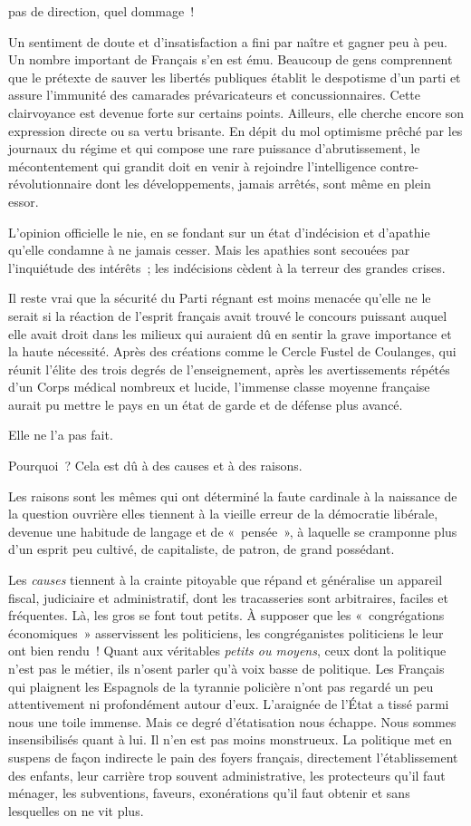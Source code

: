 \documentclass[french,twoside]{book} %
\begin{document}
pas de direction, quel dommage !\par
Un sentiment de doute et d’insatisfaction a fini par naître et gagner peu à peu. Un nombre important de Français s’en est ému. Beaucoup de gens comprennent que le prétexte de sauver les libertés publiques établit le despotisme d’un parti et assure l’immunité des camarades prévaricateurs et concussionnaires. Cette clairvoyance est devenue forte sur certains points. Ailleurs, elle cherche encore son expression directe ou sa vertu brisante. En dépit du mol optimisme prêché par les journaux du régime et qui compose une rare puissance d’abrutissement, le mécontentement qui grandit doit en venir à rejoindre l’intelligence contre-révolutionnaire dont les développements, jamais arrêtés, sont même en plein essor.\par
L’opinion officielle le nie, en se fondant sur un état d’indécision et d’apathie qu’elle condamne à ne jamais cesser. Mais les apathies sont secouées par l’inquiétude des intérêts ; les indécisions cèdent à la terreur des grandes crises.\par
Il reste vrai que la sécurité du Parti régnant est moins menacée qu’elle ne le serait si la réaction de l’esprit français avait trouvé le concours puissant auquel elle avait droit dans les milieux qui auraient dû en sentir la grave importance et la haute nécessité. Après des créations comme le Cercle Fustel de Coulanges, qui réunit l’élite des trois degrés de l’enseignement, après les avertissements répétés d’un Corps médical nombreux et lucide, l’immense classe moyenne française aurait pu mettre le pays en un état de garde et de défense plus avancé.\par
Elle ne l’a pas fait.\par
Pourquoi ? Cela est dû à des causes et à des raisons.\par
Les raisons sont les mêmes qui ont déterminé la faute cardinale à la naissance de la question ouvrière elles tiennent à la vieille erreur de la démocratie libérale, devenue une habitude de langage et de « pensée », à laquelle se cramponne plus d’un esprit peu cultivé, de capitaliste, de patron, de grand possédant.\par
Les \emph{causes} tiennent à la crainte pitoyable que répand et généralise un appareil fiscal, judiciaire et administratif, dont les tracasseries sont arbitraires, faciles et fréquentes. Là, les gros se font tout petits. À supposer que les « congrégations économiques » asservissent les politiciens, les congréganistes politiciens le leur ont bien rendu ! Quant aux véritables \emph{petits ou moyens}, ceux dont la politique n’est pas le métier, ils n’osent parler qu’à voix basse de politique. Les Français qui plaignent les Espagnols de la tyrannie policière n’ont pas regardé un peu attentivement ni profondément autour d’eux. L’araignée de l’État a tissé parmi nous une toile immense. Mais ce degré d’étatisation nous échappe. Nous sommes insensibilisés quant à lui. Il n’en est pas moins monstrueux. La politique met en suspens de façon indirecte le pain des foyers français, directement l’établissement des enfants, leur carrière trop souvent administrative, les protecteurs qu’il faut ménager, les subventions, faveurs, exonérations qu’il faut obtenir et sans lesquelles on ne vit plus.\par
\end{document}
